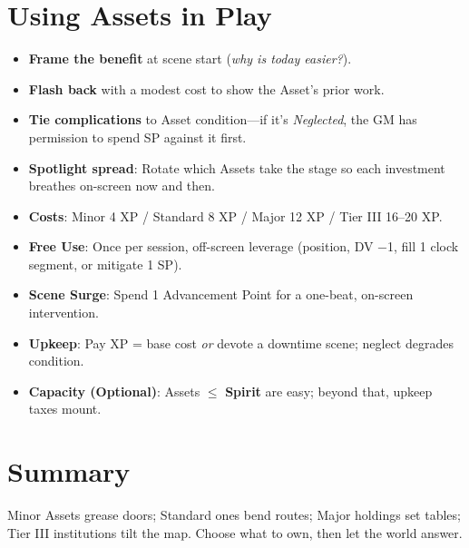 \section{Using Assets in Play}
\begin{itemize}
  \item \textbf{Frame the benefit} at scene start (\emph{why is today easier?}).
  \item \textbf{Flash back} with a modest cost to show the Asset’s prior work.
  \item \textbf{Tie complications} to Asset condition—if it’s \emph{Neglected}, the GM has permission to spend SP against it first.
  \item \textbf{Spotlight spread}: Rotate which Assets take the stage so each investment breathes on-screen now and then.
\end{itemize}

\begin{tcolorbox}[colback=blue!5!white,colframe=blue!75!black,title=Asset Quick Reference,fonttitle=\bfseries]
\begin{itemize}
  \item \textbf{Costs}: Minor 4 XP / Standard 8 XP / Major 12 XP / Tier III 16–20 XP.
  \item \textbf{Free Use}: Once per session, off-screen leverage (position, DV −1, fill 1 clock segment, or mitigate 1 SP).
  \item \textbf{Scene Surge}: Spend 1 Advancement Point for a one-beat, on-screen intervention.
  \item \textbf{Upkeep}: Pay XP = base cost \emph{or} devote a downtime scene; neglect degrades condition.
  \item \textbf{Capacity (Optional)}: Assets $\leq$ \textbf{Spirit} are easy; beyond that, upkeep taxes mount.
\end{itemize}
\end{tcolorbox}

\section{Summary}
Minor Assets grease doors; Standard ones bend routes; Major holdings set tables; Tier III institutions tilt the map. Choose what to own, then let the world answer.
